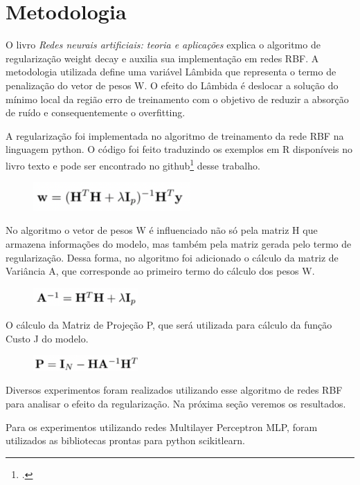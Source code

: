 \section{Metodologia}

O livro \emph{Redes neurais artificiais: teoria e aplicações}\cite{LivroTexto} explica o algoritmo de regularização weight decay
e auxilia sua implementação em redes RBF. A metodologia utilizada define uma variável Lâmbida que representa o termo de penalização do vetor de pesos W.
O efeito do Lâmbida é deslocar a solução do mínimo local da região erro de treinamento com o objetivo de reduzir a absorção de ruído e consequentemente o overfitting.

A regularização foi implementada no algoritmo de treinamento da rede RBF na linguagem python. O código foi feito traduzindo os exemplos em R disponíveis no livro texto e pode ser encontrado no github\footcite{LINK DO GIT} desse trabalho.

\begin{figure}[H]
    \center
    \includegraphics[width=6cm]{images/img9.png}
    \label{img9}
\end{figure}

No algoritmo o vetor de pesos W é influenciado não só pela matriz H que armazena informações do modelo, mas também pela matriz gerada pelo termo de regularização.
Dessa forma, no algoritmo foi adicionado o cálculo da matriz de Variância A, que corresponde ao primeiro termo do cálculo dos pesos W.

\begin{figure}[H]
    \center
    \includegraphics[width=4cm]{images/img10.png}
\end{figure}

O cálculo da Matriz de Projeção P, que será utilizada para cálculo da função Custo J do modelo.

\begin{figure}[H]
    \center
    \includegraphics[width=4cm]{images/img11.png}
\end{figure}

Diversos experimentos foram realizados utilizando esse algoritmo de redes RBF para analisar o efeito da regularização. Na próxima seção veremos os resultados.

Para os experimentos utilizando redes Multilayer Perceptron MLP, foram utilizados as bibliotecas prontas para python scikitlearn\cite*[]{scikitlearn}.